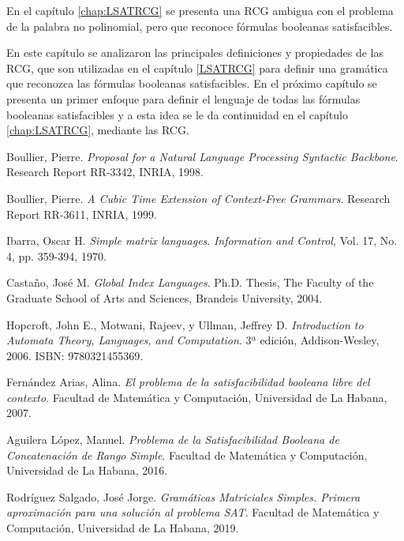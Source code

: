 \documentclass[12pt]{article}
\begin{document}
En el capítulo \ref{chap:LSATRCG} se presenta una RCG ambigua con el problema de la palabra no polinomial, 
pero que reconoce fórmulas booleanas satisfacibles.

En este capítulo se analizaron las principales definiciones y propiedades de las RCG, que son utilizadas en el capítulo \ref{LSATRCG} para definir una gramática que reconozca las fórmulas booleanas satisfacibles.  En el próximo capítulo se presenta un primer enfoque para definir el lenguaje de todas las fórmulas booleanas satisfacibles y a esta idea se le da continuidad en el capítulo \ref{chap:LSATRCG}, mediante las RCG.

\begin{thebibliography}{99}
    
    Boullier, Pierre.
    \textit{Proposal for a Natural Language Processing Syntactic Backbone}.
    Research Report RR-3342, INRIA, 1998.
    
    Boullier, Pierre.
    \textit{A Cubic Time Extension of Context-Free Grammars}.
    Research Report RR-3611, INRIA, 1999.
    
    Ibarra, Oscar H.
    \textit{Simple matrix languages}.
    \textit{Information and Control}, Vol. 17, No. 4, pp. 359-394, 1970.
    
    Castaño, José M.
    \textit{Global Index Languages}.
    Ph.D. Thesis, The Faculty of the Graduate School of Arts and Sciences, Brandeis University, 2004.
    
    Hopcroft, John E., Motwani, Rajeev, y Ullman, Jeffrey D.
    \textit{Introduction to Automata Theory, Languages, and Computation}.
    3ª edición, Addison-Wesley, 2006. ISBN: 9780321455369.
    
    Fernández Arias, Alina.
    \textit{El problema de la satisfacibilidad booleana libre del contexto}.
    Facultad de Matemática y Computación, Universidad de La Habana, 2007.
    
    Aguilera López, Manuel.
    \textit{Problema de la Satisfacibilidad Booleana de Concatenación de Rango Simple}.
    Facultad de Matemática y Computación, Universidad de La Habana, 2016.
    
    Rodríguez Salgado, José Jorge.
    \textit{Gramáticas Matriciales Simples. Primera aproximación para una solución al problema SAT}.
    Facultad de Matemática y Computación, Universidad de La Habana, 2019.
    
\end{thebibliography}
\end{document}
